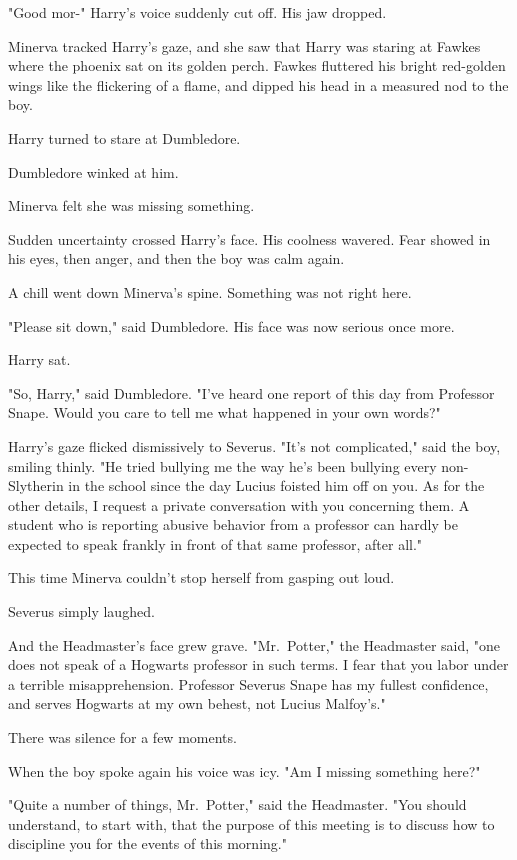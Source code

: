 "Good mor-" Harry's voice suddenly cut off. His jaw dropped.

Minerva tracked Harry's gaze, and she saw that Harry was staring at Fawkes 
where the phoenix sat on its golden perch. Fawkes fluttered his bright 
red-golden wings like the flickering of a flame, and dipped his head in a 
measured nod to the boy.

Harry turned to stare at Dumbledore.

Dumbledore winked at him.

Minerva felt she was missing something.

Sudden uncertainty crossed Harry's face. His coolness wavered. Fear showed in 
his eyes, then anger, and then the boy was calm again.

A chill went down Minerva's spine. Something was not right here.

"Please sit down," said Dumbledore. His face was now serious once more.

Harry sat.

"So, Harry," said Dumbledore. "I've heard one report of this day from Professor 
Snape. Would you care to tell me what happened in your own words?"

Harry's gaze flicked dismissively to Severus. "It's not complicated," said the 
boy, smiling thinly. "He tried bullying me the way he's been bullying every 
non-Slytherin in the school since the day Lucius foisted him off on you. As for 
the other details, I request a private conversation with you concerning them. A 
student who is reporting abusive behavior from a professor can hardly be 
expected to speak frankly in front of that same professor, after all."

This time Minerva couldn't stop herself from gasping out loud.

Severus simply laughed.

And the Headmaster's face grew grave. "Mr.~Potter," the Headmaster said, "one 
does not speak of a Hogwarts professor in such terms. I fear that you labor 
under a terrible misapprehension. Professor Severus Snape has my fullest 
confidence, and serves Hogwarts at my own behest, not Lucius Malfoy's."

There was silence for a few moments.

When the boy spoke again his voice was icy. "Am I missing something here?"

"Quite a number of things, Mr.~Potter," said the Headmaster. "You should 
understand, to start with, that the purpose of this meeting is to discuss how 
to discipline you for the events of this morning."

